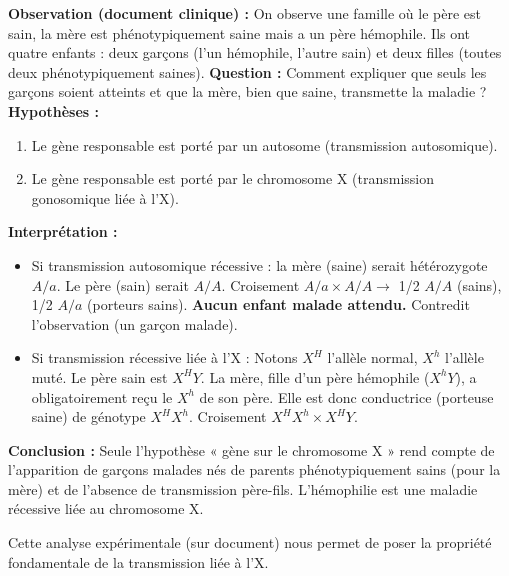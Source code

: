 \documentclass[11pt]{article}
\newcommand{\cle}[1]{{\popxbold\color{popdark}#1}}
\begin{document}
\begin{experience}
\textbf{Observation (document clinique) :} On observe une famille où le père est sain, la mère est phénotypiquement saine mais a un père hémophile. Ils ont quatre enfants : deux garçons (l'un hémophile, l'autre sain) et deux filles (toutes deux phénotypiquement saines).
\textbf{Question :} Comment expliquer que seuls les garçons soient atteints et que la mère, bien que saine, transmette la maladie ?
\textbf{Hypothèses :}
\begin{enumerate}
    \item Le gène responsable est porté par un autosome (transmission autosomique).
    \item Le gène responsable est porté par le chromosome X (transmission gonosomique liée à l'X).
\end{enumerate}
\textbf{Interprétation :}
\begin{itemize}
    \item Si transmission autosomique récessive : la mère (saine) serait hétérozygote $A/a$. Le père (sain) serait $A/A$. Croisement $A/a \times A/A \rightarrow$ 1/2 $A/A$ (sains), 1/2 $A/a$ (porteurs sains). \textbf{Aucun enfant malade attendu.} Contredit l'observation (un garçon malade).
    \item Si transmission récessive liée à l'X : Notons $X^H$ l'allèle normal, $X^h$ l'allèle muté. Le père sain est $X^H Y$. La mère, fille d'un père hémophile ($X^h Y$), a obligatoirement reçu le $X^h$ de son père. Elle est donc \cle{conductrice} (porteuse saine) de génotype $X^H X^h$. Croisement $X^H X^h \times X^H Y$.
\end{itemize}
\textbf{Conclusion :} Seule l'hypothèse « gène sur le chromosome X » rend compte de l'apparition de garçons malades nés de parents phénotypiquement sains (pour la mère) et de l'absence de transmission père-fils. L'hémophilie est une maladie \cle{récessive liée au chromosome X}.
\end{experience}

\noindent Cette analyse expérimentale (sur document) nous permet de poser la propriété fondamentale de la transmission liée à l'X.
\end{document}

